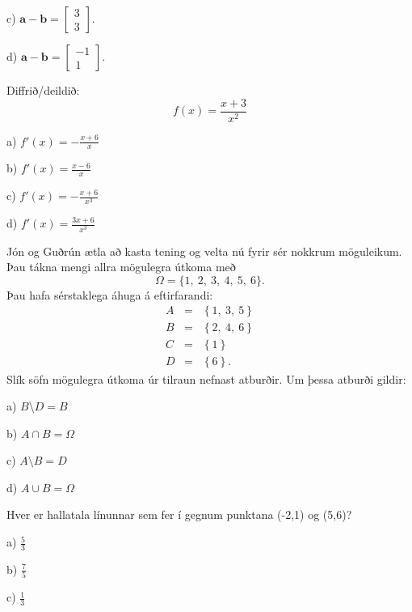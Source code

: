 c) $ \mathbf{a} - \mathbf{b} = \left[  \begin{matrix} 3 \\ 3 \end{matrix} \right] $.

d) $ \mathbf{a} - \mathbf{b} = \left[  \begin{matrix} -1\\ 1 \end{matrix} \right] $. %


\item Diffrið/deildið: $$f(x)=\frac{x+3}{x^2}$$

a) \hspace{2mm} $\displaystyle f'(x)=-\frac{x+6}{x}$

b) \hspace{2mm} $\displaystyle f'(x)=\frac{x-6}{x}$

c) \hspace{2mm} $\displaystyle f'(x)=-\frac{x+6}{x^3}$ %

d) \hspace{2mm} $\displaystyle f'(x)=\frac{3x+6}{x^3}$


\item Jón og Guðrún ætla að kasta tening og velta nú fyrir sér nokkrum möguleikum. Þau tákna mengi
allra mögulegra útkoma með
$$
\Omega=\{1,\ 2,\ 3,\ 4,\ 5,\ 6\}.
$$
Þau hafa sérstaklega áhuga á eftirfarandi:
\begin{eqnarray*}
A&=&\left \{ 1,\ 3,\ 5 \right \} \\
B&=&\left \{ 2,\ 4,\ 6  \right \} \\
C&=&\left \{ 1 \right \} \\
D&=&\left \{ 6 \right \}.
\end{eqnarray*}
Slík söfn mögulegra útkoma úr tilraun nefnast atburðir. Um þessa atburði gildir:

a) $B\setminus D=B $

b) $A\cap B=\Omega$

c) $A\setminus B=D$

d) $A\cup B=\Omega$ %


\item Hver er hallatala línunnar sem fer í gegnum punktana (-2,1) og (5,6)?

a) \hspace{2mm} $\displaystyle\frac{5}{3}$

b) \hspace{2mm} $\displaystyle\frac{7}{5}$

c) \hspace{2mm} $\displaystyle\frac{1}{3}$

